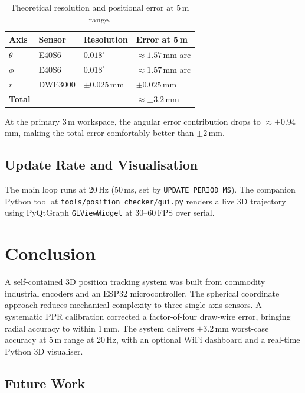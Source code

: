 \documentclass[11pt,a4paper]{article}
\begin{document}
\renewcommand{\arraystretch}{1.3}
\begin{table}[h]
\centering
\caption{Theoretical resolution and positional error at 5\,m range.}
\label{tab:accuracy}
\begin{tabular}{@{}llll@{}}
\toprule
\textbf{Axis} & \textbf{Sensor} & \textbf{Resolution} &
  \textbf{Error at 5\,m} \\
\midrule
\(\theta\) & E40S6   & \(0.018^\circ\)       & \(\approx 1.57\)\,mm arc \\
\(\phi\)   & E40S6   & \(0.018^\circ\)       & \(\approx 1.57\)\,mm arc \\
\(r\)      & DWE3000 & \(\pm 0.025\)\,mm     & \(\pm 0.025\)\,mm        \\
\textbf{Total} & ---  & ---                   & \(\approx \pm 3.2\)\,mm  \\
\bottomrule
\end{tabular}
\end{table}

At the primary 3\,m workspace, the angular error contribution drops to
\(\approx \pm 0.94\)\,mm, making the total error comfortably better
than \(\pm 2\)\,mm.

\subsection{Update Rate and Visualisation}

The main loop runs at 20\,Hz (50\,ms, set by
\texttt{UPDATE\_PERIOD\_MS}).  The companion Python tool at
\texttt{tools/position\_checker/gui.py} renders a live 3D trajectory
using PyQtGraph \texttt{GLViewWidget} at 30--60\,FPS over serial.

\section{Conclusion}
\label{sec:conclusion}

A self-contained 3D position tracking system was built from commodity
industrial encoders and an ESP32 microcontroller.  The spherical
coordinate approach reduces mechanical complexity to three single-axis
sensors.  A systematic PPR calibration corrected a factor-of-four
draw-wire error, bringing radial accuracy to within 1\,mm.  The system
delivers \(\pm 3.2\)\,mm worst-case accuracy at 5\,m range at 20\,Hz,
with an optional WiFi dashboard and a real-time Python 3D visualiser.

\subsection*{Future Work}
\end{document}
